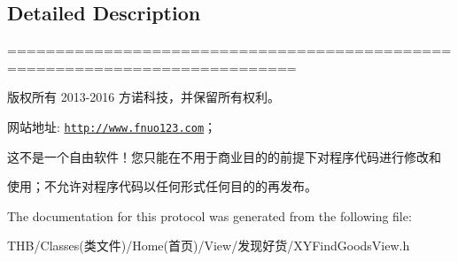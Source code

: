 \subsection{Detailed Description}
============================================================================

版权所有 2013-\/2016 方诺科技，并保留所有权利。

网站地址\+: \href{http://www.fnuo123.com}{\tt http\+://www.\+fnuo123.\+com}； 



这不是一个自由软件！您只能在不用于商业目的的前提下对程序代码进行修改和

使用；不允许对程序代码以任何形式任何目的的再发布。 

 

The documentation for this protocol was generated from the following file\+:\begin{DoxyCompactItemize}
\item 
T\+H\+B/\+Classes(类文件)/\+Home(首页)/\+View/发现好货/X\+Y\+Find\+Goods\+View.\+h\end{DoxyCompactItemize}
